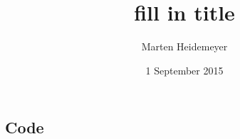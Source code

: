 \documentclass{sfuthesis}
\title{fill in title}
\author{Marten Heidemeyer}
\date{1 September 2015}
\begin{document}
\doublespacing
\large{
\frontmatter
\maketitle{}

\begin{abstract}
	
\end{abstract}

\begin{dedication} %
\end{dedication}

\begin{acknowledgements} %
\end{acknowledgements}

\tableofcontents\clearpage
{}\listoftables\clearpage
{}\listoffigures
%
%

\mainmatter%










%
%
%
%
%

\backmatter%
	
	

\begin{appendices} %
	\chapter{Code}
\end{appendices}
}
\end{document}
